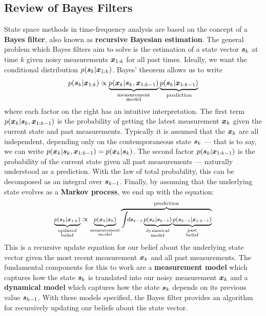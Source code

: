 \documentclass[twocolumn]{gwclass}
\begin{document}
\subsection{Review of Bayes Filters}
State space methods in time-frequency analysis are based on the concept of a \textbf{Bayes filter}, also known as \textbf{recursive Bayesian estimation}. The general problem which Bayes filters aim to solve is the estimation of a state vector $\boldsymbol{s}_k$ at time $k$ given noisy measurements $\boldsymbol{x}_{1:k}$ for all past times. Ideally, we want the conditional distribution $p(\boldsymbol{s}_k|\boldsymbol{x}_{1:k})$. Bayes' theorem allows us to write
$$ p(\boldsymbol{s}_k|\boldsymbol{x}_{1:k}) \propto \underbrace{p(\boldsymbol{x}_k|\boldsymbol{s}_k,\boldsymbol{x}_{1:k-1})}_{\substack{\text{\normalfont{measurement}}\\\text{\normalfont{model}}}} \underbrace{p(\boldsymbol{s}_k|\boldsymbol{x}_{1:k-1})}_{\text{\normalfont{prediction}}} $$
where each factor on the right has an intuitive interpretation. The first term $p(\boldsymbol{x}_k|\boldsymbol{s}_k,\boldsymbol{x}_{1:k-1})$ is the probability of getting the latest measurement $\boldsymbol{x}_k$ given the current state and past measurements. Typically it is assumed that the $\boldsymbol{x}_k$ are all independent, depending only on the contemporaneous state $\boldsymbol{s}_k$ --- that is to say, we can write $p(\boldsymbol{x}_k|\boldsymbol{s}_k,\boldsymbol{x}_{1:k-1}) = p(\boldsymbol{x}_k|\boldsymbol{s}_k)$. The second factor $p(\boldsymbol{s}_k|\boldsymbol{x}_{1:k-1})$ is the probability of the current state given all past measurements --- naturally understood as a prediction. With the law of total probability, this can be decomposed as an integral over $\boldsymbol{s}_{k-1}$.  Finally, by assuming that the underlying state evolves as a \textbf{Markov process}, we end up with the equation:
$$ \footnotesize \underbrace{p(\boldsymbol{s}_{\scriptscriptstyle k}|\boldsymbol{x}_{\scriptscriptstyle1:k})}_{\substack{\text{\normalfont{updated}}\\\text{\normalfont{belief}}}}\propto \underbrace{p(\boldsymbol{x}_{\scriptscriptstyle k}|\boldsymbol{s}_{\scriptscriptstyle k})}_{\substack{\text{\normalfont{measurement}}\\\text{\normalfont{model}}}}\overbrace{\int\hspace{-0.4em} d\boldsymbol{s}_{\scriptscriptstyle k-1}\underbrace{p(\boldsymbol{s}_{\scriptscriptstyle k}|\boldsymbol{s}_{\scriptscriptstyle k-1})}_{\substack{\text{\normalfont{dynamical}}\\\text{\normalfont{model}}}} \underbrace{p(\boldsymbol{s}_{\scriptscriptstyle k-1}|\boldsymbol{x}_{ \scriptscriptstyle1:k-1})}_{\substack{\text{\normalfont{past}}\\\text{\normalfont{belief}}}}}^{\text{\normalfont{prediction}}} $$
This is a recursive update equation for our belief about the underlying state vector given the most recent measurement $\boldsymbol{x}_k$ and all past measurements. The fundamental components for this to work are a \textbf{measurement model} which captures how the state $\boldsymbol{s}_k$ is translated into our noisy measurement $\boldsymbol{x}_k$ and a \textbf{dynamical model} which captures how the state $\boldsymbol{s}_k$ depends on its previous value $\boldsymbol{s}_{k-1}$. With these models specified, the Bayes filter provides an algorithm for recursively updating our beliefs about the state vector.
\end{document}
